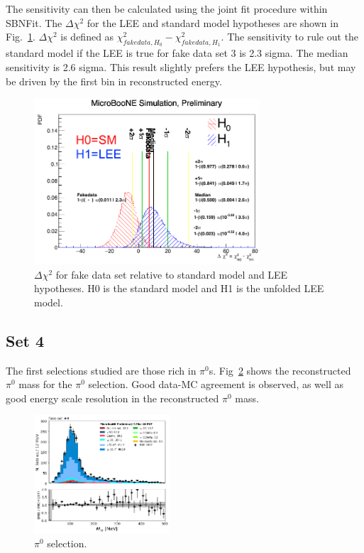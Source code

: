 The sensitivity can then be calculated using the joint fit procedure within SBNFit. The $\Delta \chi^{2}$ for the LEE and standard model hypotheses are shown in Fig.~\ref{fig:fakedata:set3:sens}.  $\Delta \chi^{2}$ is defined as $\chi^{2}_{fakedata, H_{0}}-\chi^{2}_{fakedata, H_{1}}$. The sensitivity to rule out the standard model if the LEE is true for fake data set 3 is 2.3 sigma.  The median sensitivity is 2.6 sigma. This result slightly prefers the LEE hypothesis, but may be driven by the first bin in reconstructed energy.

\begin{figure}[H]
\begin{center}
\includegraphics[width=0.75\textwidth]{Fakedata/set3/sens.pdf}
\caption{\label{fig:fakedata:set3:sens} $\Delta \chi^{2}$ for fake data set relative to standard model and LEE hypotheses. H0 is the standard model and H1 is the unfolded LEE model.}
\end{center}
\end{figure}

\subsection{Set 4}

The first selections studied are those rich in $\pi^{0}$s. Fig~\ref{fig:fakedata:set4:pi0} shows the reconstructed $\pi^{0}$ mass for the $\pi^{0}$ selection. Good data-MC agreement is observed, as well as good energy scale resolution in the reconstructed $\pi^{0}$ mass. 
\begin{figure}[H]
\begin{center}
\includegraphics[width=0.45\textwidth]{Fakedata/set4/pi0.pdf}
\caption{\label{fig:fakedata:set4:pi0} $\pi^{0}$ selection.}
\end{center}
\end{figure}

